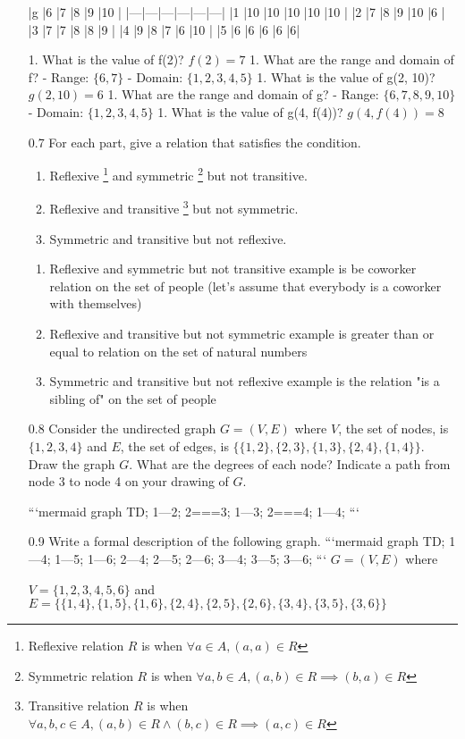 \documentclass[12pt, a4paper]{article}
\begin{document}
\begin{enumerate}
|g |6 |7 |8 |9 |10 |
|---|---|---|---|---|---|
|1 |10 |10 |10 |10 |10 |
|2 |7 |8 |9 |10 |6 |
|3 |7 |7 |8 |8 |9 |
|4 |9 |8 |7 |6 |10 |
|5 |6 |6 |6 |6 |6|

1. What is the value of f(2)? 
    $f(2) = 7$
1. What are the range and domain of f?
    - Range: $\{6, 7\}$
    - Domain: $\{1, 2, 3, 4, 5\}$
1. What is the value of g(2, 10)?
    $g(2, 10) = 6$
1. What are the range and domain of g?
    - Range: $\{6, 7, 8, 9, 10\}$
    - Domain: $\{1, 2, 3, 4, 5\}$
1. What is the value of g(4, f(4))?
    $g(4, f(4)) = 8$

    \item[0.7]
For each part, give a relation that satisfies the condition.
\begin{enumerate}
    \item  Reflexive
    \footnote{Reflexive relation $R$ is when $\forall a \in A, (a, a) \in R$} and symmetric
    \footnote{Symmetric relation $R$ is when $\forall a, b \in A, (a, b) \in R \implies (b, a) \in R$} but not transitive.
    \item  Reflexive and transitive
    \footnote{Transitive relation $R$ is when $\forall a, b, c \in A, (a, b) \in R \land (b, c) \in R \implies (a, c) \in R$} but not symmetric.
    \item  Symmetric and transitive but not reflexive.
\end{enumerate}

\begin{enumerate}

    \item Reflexive and symmetric but not transitive example is be coworker relation on the set of people (let's assume that everybody is a coworker with themselves)
    \item Reflexive and transitive but not symmetric example is greater than or equal to relation on the set of natural numbers
    \item Symmetric and transitive but not reflexive example is the relation "is a sibling of" on the set of people
\end{enumerate}

    \item[0.8]
Consider the undirected graph $G = (V, E)$ where $V$, the set of nodes, is $\{1, 2, 3, 4\}$ and $E$, the set of edges, is $\{\{1, 2\}, \{2, 3\}, \{1, 3\}, \{2, 4\}, \{1, 4\}\}$. Draw the graph $G$. What are the degrees of each node? Indicate a path from node 3 to node 4 on your drawing of $G$.

```mermaid
graph TD;
    1---2;
    2===3;
    1---3;
    2===4;
    1---4;
```

    \item[0.9]
Write a formal description of the following graph.
```mermaid
graph TD;
    1---4;
    1---5;
    1---6;
    2---4;
    2---5;
    2---6;
    3---4;
    3---5;
    3---6;
```
$G = (V, E)$ where 

$V = \{1, 2, 3, 4, 5, 6\}$ and $E = \{\{1, 4\}, \{1, 5\}, \{1, 6\}, \{2, 4\}, \{2, 5\}, \{2, 6\}, \{3, 4\}, \{3, 5\}, \{3, 6\}\}$
\end{enumerate}
\end{document}
